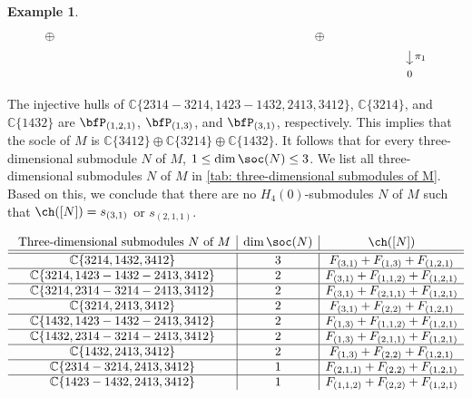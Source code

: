 \documentclass[12pt, reqno]{amsart}
\theoremstyle{definition}
\newtheorem{example}[theorem]{Example}
\numberwithin{equation}{section} \numberwithin{figure}{section}
\numberwithin{table}{section}
\def\C{\mathbb C}
\begin{document}
\begin{example}
\[\begin{tikzpicture}
\draw[->] (3*\hp + 0.25*\hp, 0.7*\vp) -- (3*\hp + 0.25*\hp, 0.4*\vp);
\node at (3*\hp + 0.25*\hp, 0.2*\vp) {\footnotesize $0$};
\node at (3.15*\hp + 0.25*\hp, 0.55*\vp) {\footnotesize $\pi_1$};

\node at (-1.75*\hp, \vp) {$\oplus$};
\node at (2*\hp, \vp) {$\oplus$};

\end{tikzpicture}
\]
The injective hulls of $\C \{2314 - 3214, 1423-1432, 2413, 3412 \}$, $\C \{3214\}$, and $\C \{1432\}$ are $\bfP_{(1,2,1)}$, $\bfP_{(1,3)}$, and $\bfP_{(3,1)}$, respectively.
This implies that the socle of $M$ is $\C\{3412\} \oplus \C \{3214\} \oplus \C \{1432\}$.
It follows that for every three-dimensional submodule $N$ of $M$, $1 \le \dim \soc(N) \le 3$.
We list all three-dimensional submodules $N$ of $M$ in \cref{tab: three-dimensional submodules of M}.
Based on this, we conclude that there are no $H_4(0)$-submodules $N$ of $M$ such that $\ch([N]) = s_{(3,1)}$ or $s_{(2,1,1)}$.
\end{example}



\begin{table}[t]
\renewcommand*\arraystretch{1.2}
\centering
$\begin{array}{c|c|c}
\text{ Three-dimensional submodules $N$ of $M$} & \dim \soc (N) & \ch([N]) 
\\ \hline \hline
\C \{3214, 1432, 3412\} & 3 & F_{(3,1)} + F_{(1,3)} + F_{(1,2,1)}
\\ \hline
\C \{3214, 1423 - 1432 - 2413, 3412\} & 2 & F_{(3,1)} + F_{(1,1,2)} + F_{(1,2,1)}
\\ \hline
\C \{3214, 2314 - 3214 - 2413, 3412\} & 2 & F_{(3,1)} + F_{(2,1,1)} + F_{(1,2,1)}
\\ \hline
\C \{3214, 2413, 3412\} & 2 & F_{(3,1)} + F_{(2,2)} + F_{(1,2,1)}
\\ \hline
\C \{1432, 1423 - 1432 - 2413, 3412\} & 2 & F_{(1,3)} + F_{(1,1,2)} + F_{(1,2,1)}
\\ \hline
\C \{1432, 2314 - 3214 - 2413, 3412 \} & 2 & F_{(1,3)} + F_{(2,1,1)} + F_{(1,2,1)}
\\ \hline
\C \{1432, 2413, 3412\} & 2 & F_{(1,3)} + F_{(2,2)} + F_{(1,2,1)}
\\ \hline
\C \{2314 - 3214, 2413, 3412\} & 1 & F_{(2,1,1)} + F_{(2,2)} + F_{(1,2,1)}
\\ \hline
\C \{1423-1432, 2413, 3412\} & 1 & F_{(1,1,2)} + F_{(2,2)} + F_{(1,2,1)}
\end{array}$
\caption{The complete list of three-dimensional submodules of $M$ in \cref{eg: not dist filt}}
\label{tab: three-dimensional submodules of M}
\end{table}
\end{document}
